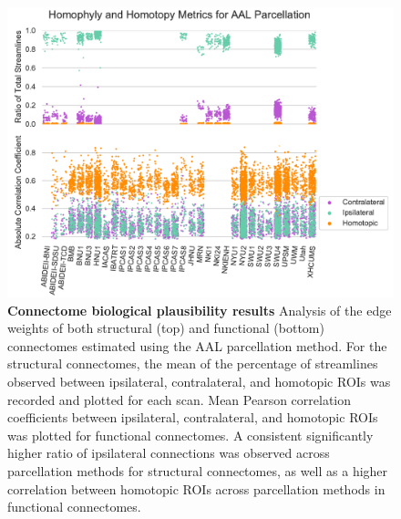 \begin{figure}[b!]
    \centering
    \includegraphics[width=1\textwidth]{figures/m2g/ipsi_aal.pdf}
    \caption[Analysis of the edge weights of both structural (top) and functional (bottom) connectomes estimated using the AAL parcellation method.]{\textbf{Connectome biological plausibility results} Analysis of the edge weights of both structural (top) and functional (bottom) connectomes estimated using the AAL parcellation method. For the structural connectomes, the mean of the percentage of streamlines observed between ipsilateral, contralateral, and homotopic ROIs was recorded and plotted for each scan. Mean Pearson correlation coefficients between ipsilateral, contralateral, and homotopic ROIs was plotted for functional connectomes. A consistent significantly higher ratio of ipsilateral connections was observed across parcellation methods for structural connectomes, as well as a higher correlation between homotopic ROIs across parcellation methods in functional connectomes.}
    \label{fig:ipsi_aal}
\end{figure}

